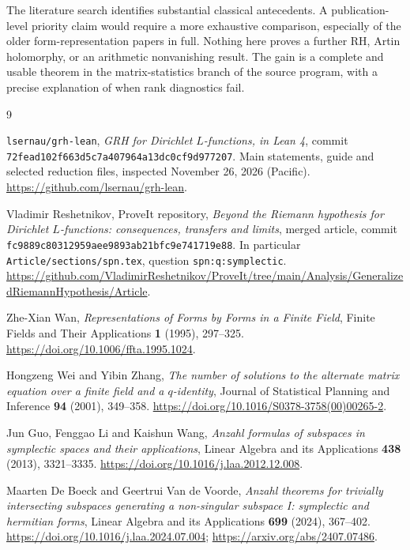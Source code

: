 \documentclass[11pt]{article}
\numberwithin{equation}{section}
\theoremstyle{definition}
\theoremstyle{remark}
\newcommand{\code}[1]{\nolinkurl{#1}}
\newcommand{\sourcecommit}{\texttt{72fead102f663d5c7a407964a13dc0cf9d977207}}
\newcommand{\articlecommit}{\texttt{fc9889c80312959aee9893ab21bfc9e741719e88}}
\begin{document}
The literature search identifies substantial classical antecedents. A publication-level priority claim would require a more exhaustive comparison, especially of the older form-representation papers in full. Nothing here proves a further RH, Artin holomorphy, or an arithmetic nonvanishing result. The gain is a complete and usable theorem in the matrix-statistics branch of the source program, with a precise explanation of when rank diagnostics fail.

\clearpage
\begin{thebibliography}{9}
\raggedright
{}
\texttt{lsernau/grh-lean}, \emph{GRH for Dirichlet $L$-functions, in Lean 4}, commit \sourcecommit. Main statements, guide and selected reduction files, inspected November 26, 2026 (Pacific).
\url{https://github.com/lsernau/grh-lean}.

Vladimir Reshetnikov, ProveIt repository, \emph{Beyond the Riemann hypothesis for Dirichlet $L$-functions: consequences, transfers and limits}, merged article, commit \articlecommit. In particular \code{Article/sections/spn.tex}, question \code{spn:q:symplectic}.
\url{https://github.com/VladimirReshetnikov/ProveIt/tree/main/Analysis/GeneralizedRiemannHypothesis/Article}.

Zhe-Xian Wan, \emph{Representations of Forms by Forms in a Finite Field}, Finite Fields and Their Applications \textbf{1} (1995), 297--325.
\url{https://doi.org/10.1006/ffta.1995.1024}.

Hongzeng Wei and Yibin Zhang, \emph{The number of solutions to the alternate matrix equation over a finite field and a $q$-identity}, Journal of Statistical Planning and Inference \textbf{94} (2001), 349--358.
\url{https://doi.org/10.1016/S0378-3758(00)00265-2}.

Jun Guo, Fenggao Li and Kaishun Wang, \emph{Anzahl formulas of subspaces in symplectic spaces and their applications}, Linear Algebra and its Applications \textbf{438} (2013), 3321--3335.
\url{https://doi.org/10.1016/j.laa.2012.12.008}.

Maarten De Boeck and Geertrui Van de Voorde, \emph{Anzahl theorems for trivially intersecting subspaces generating a non-singular subspace I: symplectic and hermitian forms}, Linear Algebra and its Applications \textbf{699} (2024), 367--402.
\url{https://doi.org/10.1016/j.laa.2024.07.004}; \url{https://arxiv.org/abs/2407.07486}.
\end{thebibliography}
\end{document}
